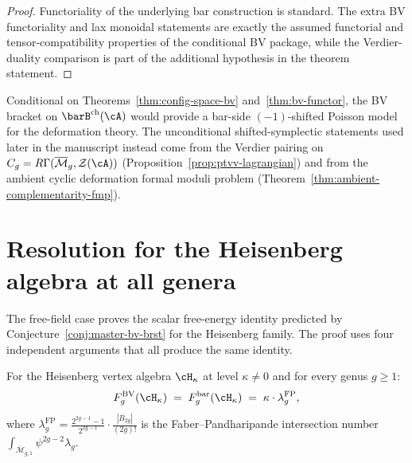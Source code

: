 \begin{proof}
Functoriality of the underlying bar construction is standard. The
extra BV functoriality and lax monoidal statements are exactly the
assumed functorial and tensor-compatibility properties of the
conditional BV package, while the Verdier-duality comparison is part
of the additional hypothesis in the theorem statement.
\end{proof}

\begin{remark}\label{rem:bv-shifted-symplectic}
Conditional on Theorems~\ref{thm:config-space-bv}
and~\ref{thm:bv-functor}, the BV bracket on
$\barB^{\mathrm{ch}}(\cA)$ would provide a bar-side
$(-1)$-shifted Poisson model for the deformation theory. The
unconditional shifted-symplectic statements used later in the
manuscript instead come from the Verdier pairing on
$C_g = R\Gamma(\overline{\mathcal{M}}_g,\mathcal{Z}(\cA))$
\textup{(}Proposition~\ref{prop:ptvv-lagrangian}\textup{)} and from
the ambient cyclic deformation formal moduli problem
\textup{(}Theorem~\ref{thm:ambient-complementarity-fmp}\textup{)}.
\end{remark}

\section{Resolution for the Heisenberg algebra at all genera}
\label{sec:bv-bar-heisenberg-all-genera}

The free-field case proves the scalar free-energy identity
predicted by Conjecture~\ref{conj:master-bv-brst}
for the Heisenberg family. The proof uses four independent
arguments that all produce the same identity.

\begin{theorem}[BV $=$ bar for the Heisenberg at all genera;
\ClaimStatusConditional]
\label{thm:heisenberg-bv-bar-all-genera-vol1}
For the Heisenberg vertex algebra $\cH_\kappa$ at level
$\kappa \neq 0$ and for every genus $g \geq 1$:
\begin{equation}\label{eq:bv-bar-heisenberg}
F_g^{\mathrm{BV}}(\cH_\kappa)
\;=\; F_g^{\mathrm{bar}}(\cH_\kappa)
\;=\; \kappa \cdot \lambda_g^{\mathrm{FP}},
\end{equation}
where $\lambda_g^{\mathrm{FP}}
= \frac{2^{2g-1}-1}{2^{2g-1}} \cdot
\frac{|B_{2g}|}{(2g)!}$
is the Faber--Pandharipande intersection number
$\int_{\overline{\mathcal{M}}_{g,1}} \psi^{2g-2}\lambda_g$.
\end{theorem}

